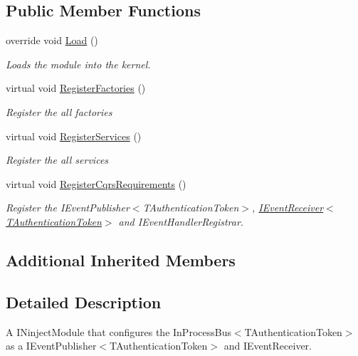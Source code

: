\subsection*{Public Member Functions}
\begin{DoxyCompactItemize}
\item 
override void \hyperlink{classCqrs_1_1Ninject_1_1Configuration_1_1InProcessEventBusModule_aee95aba5105f016f37a772b19001c0f7_aee95aba5105f016f37a772b19001c0f7}{Load} ()
\begin{DoxyCompactList}\small\item\em Loads the module into the kernel. \end{DoxyCompactList}\item 
virtual void \hyperlink{classCqrs_1_1Ninject_1_1Configuration_1_1InProcessEventBusModule_a0d0b1838c22e2bfeb4044f077739d8c8_a0d0b1838c22e2bfeb4044f077739d8c8}{Register\+Factories} ()
\begin{DoxyCompactList}\small\item\em Register the all factories \end{DoxyCompactList}\item 
virtual void \hyperlink{classCqrs_1_1Ninject_1_1Configuration_1_1InProcessEventBusModule_ac3250443c7847aed15dbcbe03ff9ac6d_ac3250443c7847aed15dbcbe03ff9ac6d}{Register\+Services} ()
\begin{DoxyCompactList}\small\item\em Register the all services \end{DoxyCompactList}\item 
virtual void \hyperlink{classCqrs_1_1Ninject_1_1Configuration_1_1InProcessEventBusModule_a9fee585df29bca69862c1543bd3b4356_a9fee585df29bca69862c1543bd3b4356}{Register\+Cqrs\+Requirements} ()
\begin{DoxyCompactList}\small\item\em Register the I\+Event\+Publisher$<$\+T\+Authentication\+Token$>$, \hyperlink{interfaceCqrs_1_1Events_1_1IEventReceiver}{I\+Event\+Receiver$<$\+T\+Authentication\+Token$>$} and I\+Event\+Handler\+Registrar. \end{DoxyCompactList}\end{DoxyCompactItemize}
\subsection*{Additional Inherited Members}


\subsection{Detailed Description}
A I\+Ninject\+Module that configures the In\+Process\+Bus$<$\+T\+Authentication\+Token$>$ as a I\+Event\+Publisher$<$\+T\+Authentication\+Token$>$ and I\+Event\+Receiver. 



